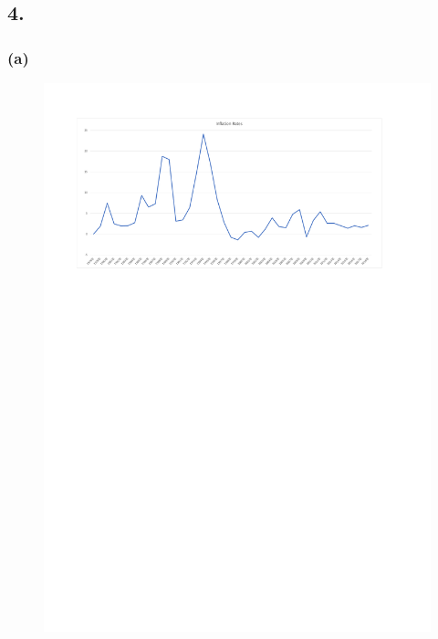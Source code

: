\documentclass[UTF8]{ctexart}
\begin{document}
\subsection*{4.}
\subsubsection*{(a)}
\begin{figure}[H]
    \centering
    \includegraphics[width=15cm]{Inflation Rates.pdf}
\end{figure}
\end{document}
